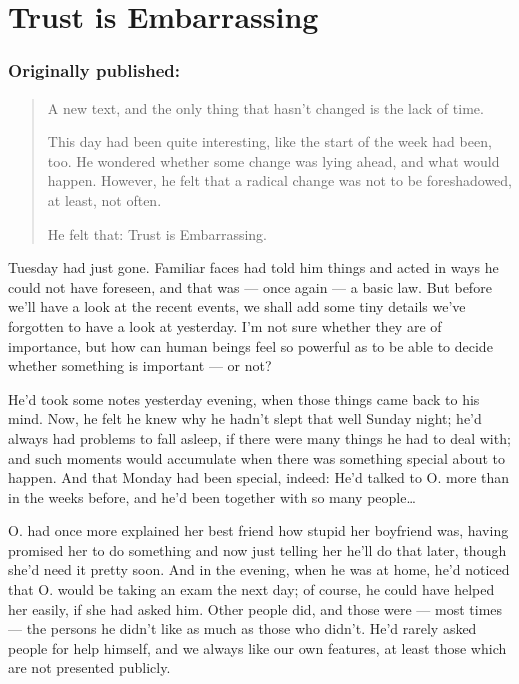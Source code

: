 \chapter{Trust is Embarrassing}
\label{cha:trust-is-embarrassing}
\subsection*{Originally published: }
\begin{quote}
A new text, and the only thing that hasn't changed is the lack of time. 

This day had been quite interesting, like the start of the week had been, too. He wondered whether some change was lying ahead, and what would happen. However, he felt that a radical change was not to be foreshadowed, at least, not often.

He felt that: Trust is Embarrassing.
\end{quote}

Tuesday had just gone. Familiar faces had told him things and acted in ways he could not have foreseen, and that was --- once again --- a basic law. But before we'll have a look at the recent events, we shall add some tiny details we've forgotten to have a look at yesterday. I'm not sure whether they are of importance, but how can human beings feel so powerful as to be able to decide whether something is important --- or not?

He'd took some notes yesterday evening, when those things came back to his mind. Now, he felt he knew why he hadn't slept that well Sunday night; he'd always had problems to fall asleep, if there were many things he had to deal with; and such moments would accumulate when there was something special about to happen. And that Monday had been special, indeed: He'd talked to O. more than in the weeks before, and he'd been together with so many people\ldots

O. had once more explained her best friend how stupid her boyfriend was, having promised her to do something and now just telling her he'll do that later, though she'd need it pretty soon. And in the evening, when he was at home, he'd noticed that O. would be taking an exam the next day; of course, he could have helped her easily, if she had asked him. Other people did, and those were --- most times --- the persons he didn't like as much as those who didn't. He'd rarely asked people for help himself, and we always like our own features, at least those which are not presented publicly.

